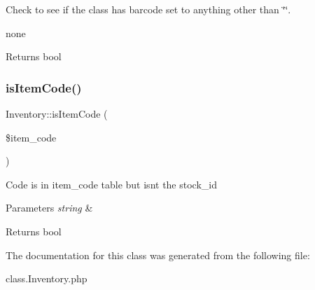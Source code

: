 Check to see if the class has barcode set to anything other than \char`\"{}\char`\"{}.

none \begin{DoxyReturn}{Returns}
bool 
\end{DoxyReturn}
\hypertarget{class_inventory_ac788e157a403fd8192b4dd2eedf57378}{}\label{class_inventory_ac788e157a403fd8192b4dd2eedf57378} 
\subsubsection{\texorpdfstring{is\+Item\+Code()}{isItemCode()}}
{\footnotesize\ttfamily Inventory\+::is\+Item\+Code (\begin{DoxyParamCaption}\item[{}]{\$item\+\_\+code }\end{DoxyParamCaption})}

Code is in item\+\_\+code table but isn\textquotesingle{}t the stock\+\_\+id


\begin{DoxyParams}{Parameters}
{\em string} & \\
\hline
\end{DoxyParams}
\begin{DoxyReturn}{Returns}
bool 
\end{DoxyReturn}


The documentation for this class was generated from the following file\+:\begin{DoxyCompactItemize}
\item 
class.\+Inventory.\+php\end{DoxyCompactItemize}
